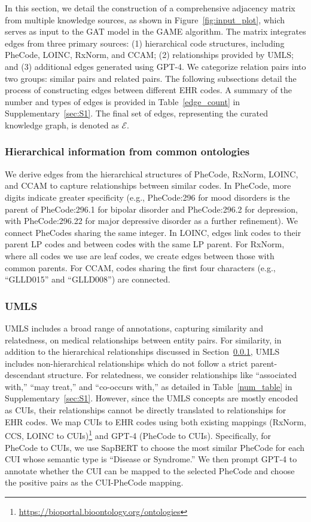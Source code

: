\documentclass{article}
\begin{document}
In this section, we detail the construction of a comprehensive adjacency matrix from multiple knowledge sources, as shown in Figure~\ref{fig:input_plot}, which serves as input to the GAT model in the GAME algorithm. The matrix integrates edges from three primary sources: (1) hierarchical code structures, including PheCode, LOINC, RxNorm, and CCAM; (2) relationships provided by UMLS; and (3) additional edges generated using GPT-4. We categorize relation pairs into two groups: similar pairs and related pairs. The following subsections detail the process of constructing edges between different EHR codes. A summary of the number and types of edges is provided in Table~\ref{edge_count} in Supplementary~\ref{sec:S1}. The final set of edges, representing the curated knowledge graph, is denoted as $\mathcal{E}$.

\subsubsection{Hierarchical information from common ontologies}
 \label{sec:hie}

We derive edges from the hierarchical structures of PheCode, RxNorm, LOINC, and CCAM to capture relationships between similar codes. In PheCode, more digits indicate greater specificity (e.g., PheCode:296 for mood disorders is the parent of PheCode:296.1 for bipolar disorder and PheCode:296.2 for depression, with PheCode:296.22 for major depressive disorder as a further refinement). We connect PheCodes sharing the same integer. In LOINC, edges link codes to their parent LP codes and between codes with the same LP parent. For RxNorm, where all codes we use are leaf codes, we create edges between those with common parents. For CCAM, codes sharing the first four characters (e.g., ``GLLD015'' and ``GLLD008'') are connected.

\subsubsection{UMLS} 
\label{sec:UMLS}

UMLS includes a broad range of annotations, capturing similarity and relatedness, on medical relationships between entity pairs. For similarity, in addition to the hierarchical relationships discussed in Section~\ref{sec:hie}, UMLS includes non-hierarchical relationships which do not follow a strict parent-descendant structure. For relatedness, we consider relationships like ``associated with,'' ``may treat,'' and ``co-occurs with,'' as detailed in Table~\ref{num_table} in Supplementary~\ref{sec:S1}. However, since the UMLS concepts are mostly encoded as CUIs, their relationships cannot be directly translated to relationships for EHR codes. We map CUIs to EHR codes using both existing mappings (RxNorm, CCS, LOINC to CUIs)\footnote{\url{https://bioportal.bioontology.org/ontologies}} and GPT-4 (PheCode to CUIs). Specifically, for PheCode to CUIs, we use SapBERT to choose the most similar PheCode for each CUI whose semantic type is ``Disease or Syndrome.'' We then prompt GPT-4 to annotate whether the CUI can be mapped to the selected PheCode and choose the positive pairs as the CUI-PheCode mapping.
\end{document}

